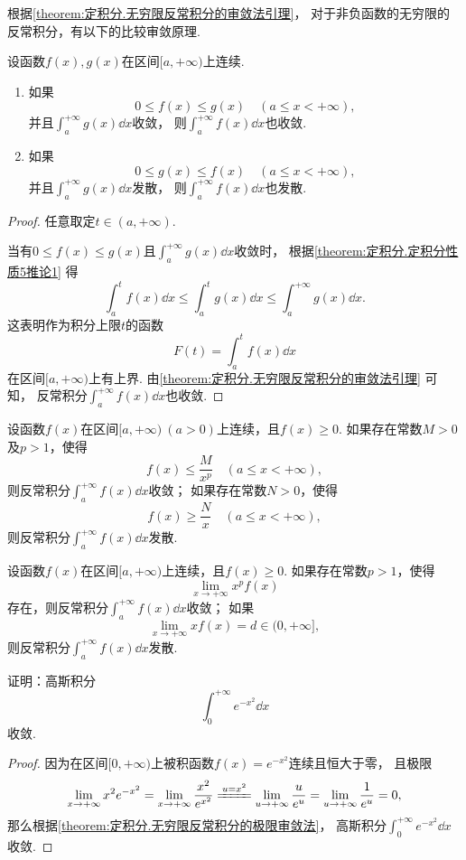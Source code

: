 根据\cref{theorem:定积分.无穷限反常积分的审敛法引理}，
对于非负函数的无穷限的反常积分，有以下的比较审敛原理.
\begin{theorem}[比较审敛原理]\label{theorem:定积分.无穷限反常积分的比较审敛原理}
设函数\(f(x),g(x)\)在区间\([a,+\infty)\)上连续.
\begin{enumerate}
	\item 如果\[
		0 \leq f(x) \leq g(x)
		\quad (a \leq x < +\infty),
	\]并且\(\int_a^{+\infty} g(x) \dd{x}\)收敛，
	则\(\int_a^{+\infty} f(x) \dd{x}\)也收敛.

	\item 如果\[
		0 \leq g(x) \leq f(x)
		\quad (a \leq x < +\infty),
	\]
	并且\(\int_a^{+\infty} g(x) \dd{x}\)发散，
	则\(\int_a^{+\infty} f(x) \dd{x}\)也发散.
\end{enumerate}
\begin{proof}
任意取定\(t \in (a,+\infty)\).

当有\(0 \leq f(x) \leq g(x)\)且\(\int_a^{+\infty} g(x) \dd{x}\)收敛时，
根据\cref{theorem:定积分.定积分性质5推论1}
得\[
	\int_a^t f(x) \dd{x}
	\leq
	\int_a^t g(x) \dd{x}
	\leq
	\int_a^{+\infty} g(x) \dd{x}.
\]
这表明作为积分上限\(t\)的函数\[
	F(t) = \int_a^t f(x) \dd{x}
\]
在区间\([a,+\infty)\)上有上界.
由\cref{theorem:定积分.无穷限反常积分的审敛法引理} 可知，
反常积分\(\int_a^{+\infty} f(x) \dd{x}\)也收敛.
\end{proof}
\end{theorem}

\begin{theorem}[比较审敛法]\label{theorem:定积分.无穷限反常积分的比较审敛法}
设函数\(f(x)\)在区间\([a,+\infty)\ (a>0)\)上连续，且\(f(x) \geq 0\).
如果存在常数\(M>0\)及\(p>1\)，使得\[
f(x) \leq \frac{M}{x^p} \quad (a \leq x < +\infty),
\]则反常积分\(\int_a^{+\infty} f(x) \dd{x}\)收敛；
如果存在常数\(N>0\)，使得\[
f(x) \geq \frac{N}{x} \quad (a \leq x < +\infty),
\]则反常积分\(\int_a^{+\infty} f(x) \dd{x}\)发散.
\end{theorem}

\begin{theorem}[极限审敛法]\label{theorem:定积分.无穷限反常积分的极限审敛法}
设函数\(f(x)\)在区间\([a,+\infty)\)上连续，且\(f(x) \geq 0\).
如果存在常数\(p > 1\)，使得\[
\lim_{x \to +\infty} x^p f(x)
\]存在，则反常积分\(\int_a^{+\infty} f(x) \dd{x}\)收敛；
如果\[
\lim_{x \to +\infty} x f(x) = d \in (0,+\infty],
\]则反常积分\(\int_a^{+\infty} f(x) \dd{x}\)发散.
\end{theorem}

\begin{example}\label{example:定积分.高斯积分的收敛性}
证明：高斯积分\[
\int_0^{+\infty} e^{-x^2} \dd{x}
\]收敛.
\begin{proof}
因为在区间\([0,+\infty)\)上被积函数\(f(x) = e^{-x^2}\)连续且恒大于零，
且极限\[
\lim_{x\to+\infty} x^2 e^{-x^2}
= \lim_{x\to+\infty} \frac{x^2}{e^{x^2}}
\xlongequal{u=x^2} \lim_{u\to+\infty} \frac{u}{e^u}
= \lim_{u\to+\infty} \frac{1}{e^u}
= 0,
\]
那么根据\cref{theorem:定积分.无穷限反常积分的极限审敛法}，
高斯积分\(\int_0^{+\infty} e^{-x^2} \dd{x}\)收敛.
\end{proof}
\end{example}

